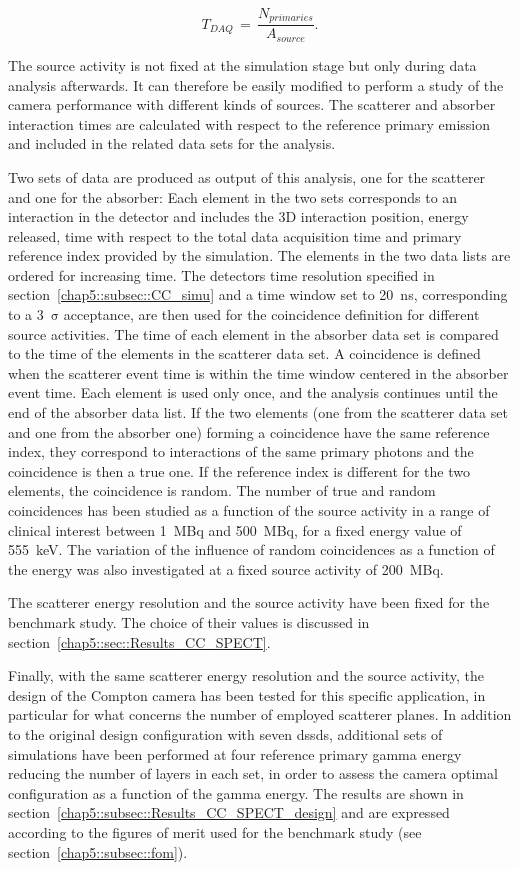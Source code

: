 \begin{equation}
T_{DAQ}\, = \,\frac{N_{primaries}}{A_{source}}.
\label{chap5::eq::DAQ_time}
\end{equation} 

The source activity is not fixed at the simulation stage but only during data analysis afterwards. It can therefore be easily modified to perform a study of the camera performance with different kinds of sources. The scatterer and absorber interaction times are calculated with respect to the reference primary emission and included in the related data sets for the analysis.

Two sets of data are produced as output of this analysis, one for the scatterer and one for the absorber: Each element in the two sets corresponds to an interaction in the detector and includes the 3D interaction position, energy released, time with respect to the total data acquisition time and primary reference index provided by the simulation. The elements in the two data lists are ordered for increasing time. The detectors time resolution specified in section~\ref{chap5::subsec::CC_simu} and a time window set to 20~ns, corresponding to a 3~$\mathrm{\sigma}$ acceptance, are then used for the coincidence definition for different source activities. The time of each element in the absorber data set is compared to the time of the elements in the scatterer data set. A coincidence is defined when the scatterer event time is within the time window centered in the absorber event time. Each element is used only once, and the analysis continues until the end of the absorber data list. If the two  elements (one from the scatterer data set and one from the absorber one) forming a coincidence have the same reference index, they correspond to interactions of the same primary photons and the coincidence is then a true one. If the reference index is different for the two elements, the coincidence is random. The number of true and random coincidences has been studied as a function of the source activity in a range of clinical interest between 1~MBq and 500~MBq, for a fixed energy value of 555~keV. The variation of the influence of random coincidences as a function of the energy was also investigated at a fixed source activity of 200~MBq.

The scatterer energy resolution and the source activity have been fixed for the benchmark study. The choice of their values is discussed in section~\ref{chap5::sec::Results_CC_SPECT}. 

Finally, with the same scatterer energy resolution and the source activity, the design of the Compton camera has been tested for this specific application, in particular for what concerns the number of employed scatterer planes. In addition to the original design configuration with seven \glspl{dssd}, additional sets of simulations have been performed at four reference primary gamma energy reducing the number of layers in each set, in order to assess the camera optimal configuration as a function of the gamma energy. The results are shown in section~\ref{chap5::subsec::Results_CC_SPECT_design} and are expressed according to the figures of merit used for the benchmark study (see section~\ref{chap5::subsec::fom}). 

